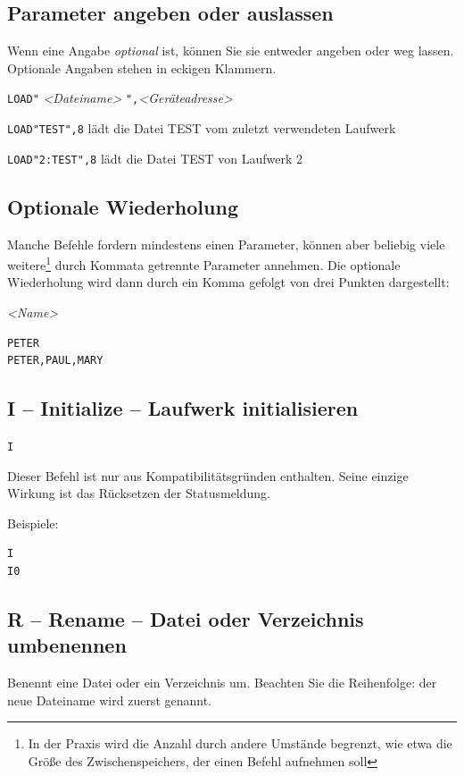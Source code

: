 \documentclass[10pt,a4paper]{scrartcl}		%
\begin{document}
\subsection*{Parameter angeben oder auslassen}
Wenn eine Angabe \textit{optional} ist, können Sie sie entweder
angeben oder weg lassen. Optionale Angaben stehen in eckigen Klammern.

\texttt{LOAD"}  \textit{<Dateiname>}
\texttt{",}\textit{<Geräteadresse>}

\texttt{LOAD"TEST",8} lädt die Datei TEST vom zuletzt 
verwendeten Laufwerk

\texttt{LOAD"2:TEST",8} lädt die Datei TEST von Laufwerk 2

\subsection*{Optionale Wiederholung}
Manche Befehle fordern mindestens einen Parameter, können aber beliebig
viele weitere\footnote{
	In der Praxis wird die Anzahl durch andere Umstände begrenzt,
	wie etwa die Größe des Zwischenspeichers, der einen Befehl
	aufnehmen soll
} durch Kommata getrennte Parameter annehmen. Die optionale Wiederholung
wird dann durch ein Komma gefolgt von drei Punkten dargestellt:

\mbox{\textit{<Name>} \Big[ \texttt{,} \ldots \ \Big]}

\begin{verbatim}
PETER
PETER,PAUL,MARY
\end{verbatim}

\subsection{I -- Initialize -- Laufwerk initialisieren}

\texttt{I} 

Dieser Befehl ist nur aus Kompatibilitätsgründen enthalten.
Seine einzige Wirkung ist das Rücksetzen der Statusmeldung.

Beispiele:
\begin{verbatim}
I
I0
\end{verbatim}

\subsection{R -- Rename -- Datei oder Verzeichnis umbenennen}
Benennt eine Datei oder ein Verzeichnis um. Beachten Sie die Reihenfolge:
der neue Dateiname wird zuerst genannt.
\end{document}
